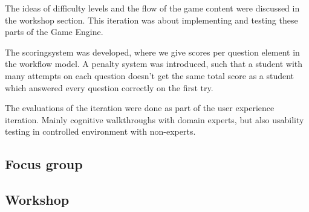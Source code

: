 The ideas of difficulty levels and the flow of the game content were discussed in the workshop section. This iteration was about implementing and testing these parts of the Game Engine.

The scoringsystem was developed, where we give scores per question element in the workflow model.  A penalty system was introduced, such that a student with many attempts on each question doesn't get the same total score as a student which answered every question correctly on the first try.

The evaluations of the iteration were done as part of the user experience iteration. Mainly cognitive walkthroughs with domain experts, but also usability testing in controlled environment with non-experts.




\subsection{Focus group}

\subsection{Workshop}